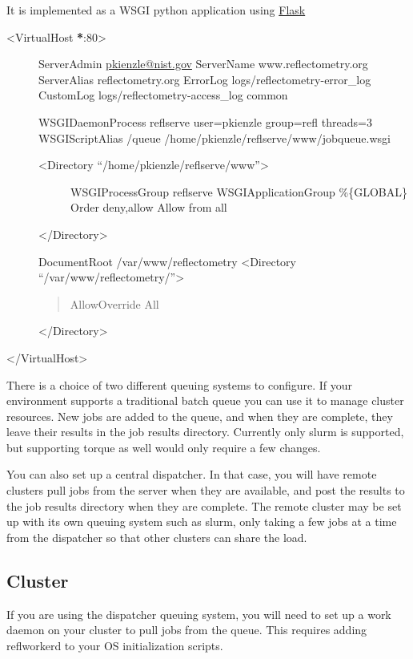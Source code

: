\documentclass[letterpaper,10pt,english]{sphinxmanual}
\begin{document}
It is implemented as a WSGI python application using
\href{http://flask.pocoo.org}{Flask}
\begin{description}
\item[{\textless{}VirtualHost {\color{red}\bfseries{}*}:80\textgreater{}}] \leavevmode
ServerAdmin \href{mailto:pkienzle@nist.gov}{pkienzle@nist.gov}
ServerName www.reflectometry.org
ServerAlias reflectometry.org
ErrorLog logs/reflectometry-error\_log
CustomLog logs/reflectometry-access\_log common

WSGIDaemonProcess reflserve user=pkienzle group=refl threads=3
WSGIScriptAlias /queue /home/pkienzle/reflserve/www/jobqueue.wsgi
\begin{description}
\item[{\textless{}Directory ``/home/pkienzle/reflserve/www''\textgreater{}}] \leavevmode
WSGIProcessGroup reflserve
WSGIApplicationGroup \%\{GLOBAL\}
Order deny,allow
Allow from all

\end{description}

\textless{}/Directory\textgreater{}

DocumentRoot /var/www/reflectometry
\textless{}Directory ``/var/www/reflectometry/''\textgreater{}
\begin{quote}

AllowOverride All
\end{quote}

\textless{}/Directory\textgreater{}

\end{description}

\textless{}/VirtualHost\textgreater{}

There is a choice of two different queuing systems to configure.  If your
environment supports a traditional batch queue you can use it to
manage cluster resources.  New jobs are added to the queue, and
when they are complete, they leave their results in the job results
directory.  Currently only slurm is supported, but supporting torque
as well would only require a few changes.

You can also set up a central dispatcher.  In that case, you will have
remote clusters pull jobs from the server when they are available, and post
the results to the job results directory when they are complete. The remote
cluster may be set up with its own queuing system such as slurm, only
taking a few jobs at a time from the dispatcher so that other clusters
can share the load.


\subsection{Cluster}
\label{getting_started/server:cluster}
If you are using the dispatcher queuing system, you will need to set up
a work daemon on your cluster to pull jobs from the queue.  This requires
adding reflworkerd to your OS initialization scripts.
\end{document}
